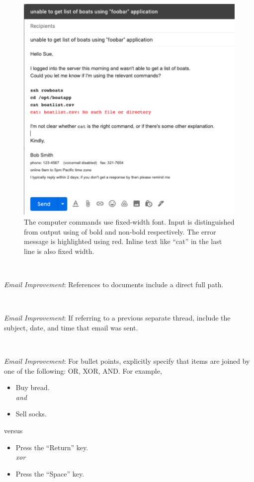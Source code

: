 \begin{figure}%
\includegraphics[width=1\textwidth]{images/email_computer_font.pdf}
\caption{The computer commands use fixed-width font. Input is distinguished from output using of bold and non-bold respectively. The error message is highlighted using red. Inline text like ``cat'' in the last line is also fixed width.}
\label{fig:email_computer_font}
\end{figure}

\ \\
\begin{samepage}
\textit{Email Improvement}: References to documents include a direct full path.
\end{samepage}

\ \\
\begin{samepage}
\textit{Email Improvement}: If referring to a previous separate thread, include the subject, date, and time that email was sent.
\end{samepage}

\ \\
\begin{samepage}
\textit{Email Improvement}: For bullet points, explicitly specify that items are joined by one of the following: OR, XOR, AND. For example,
\begin{itemize}
    \item Buy bread.\\
    \textit{and}
    \item Sell socks.
\end{itemize}
versus
\begin{itemize}
    \item Press the ``Return'' key.\\
    \textit{xor}
    \item Press the ``Space'' key.
\end{itemize}
\end{samepage}

